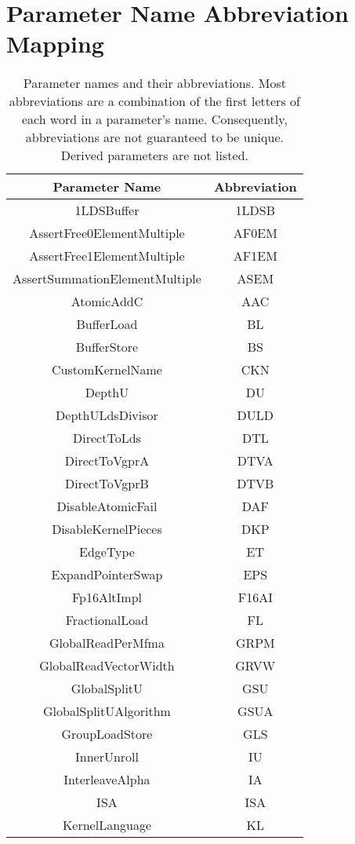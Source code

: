 \documentclass[]{article}
\begin{document}
\section{Parameter Name Abbreviation Mapping}
\begin{center}
\begin{small}
\begin{longtable}{ |c|c| }
\caption{Parameter names and their abbreviations. Most abbreviations are a combination of the first letters of each word in a parameter's name. Consequently, abbreviations are not guaranteed to be unique. Derived parameters are not listed. }
\label{tab:ParameterAbbrMap} \\
 \hline
 \textbf{Parameter Name} & \textbf{Abbreviation} \\
 \hline
 1LDSBuffer & 1LDSB \\
 AssertFree0ElementMultiple & AF0EM \\
 AssertFree1ElementMultiple & AF1EM \\
 AssertSummationElementMultiple & ASEM \\
 AtomicAddC & AAC \\
 BufferLoad & BL \\
 BufferStore & BS \\
 CustomKernelName & CKN \\
 DepthU & DU \\
 DepthULdsDivisor & DULD \\
 DirectToLds & DTL \\
 DirectToVgprA & DTVA \\
 DirectToVgprB & DTVB \\
 DisableAtomicFail & DAF \\
 DisableKernelPieces & DKP \\
 EdgeType & ET \\
 ExpandPointerSwap & EPS \\
 Fp16AltImpl & F16AI \\
 FractionalLoad & FL \\
 GlobalReadPerMfma & GRPM \\
 GlobalReadVectorWidth & GRVW \\
 GlobalSplitU & GSU \\
 GlobalSplitUAlgorithm & GSUA \\
 GroupLoadStore & GLS \\
 InnerUnroll & IU \\
 InterleaveAlpha & IA \\
 ISA & ISA \\
 KernelLanguage & KL \\

\end{longtable}
\end{small}
\end{center}
\end{document}
